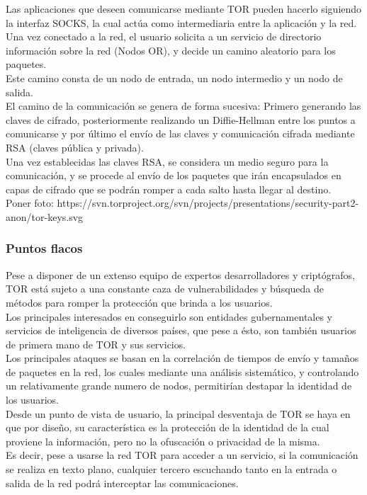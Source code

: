 Las aplicaciones que deseen comunicarse mediante TOR pueden hacerlo siguiendo la interfaz SOCKS, la cual actúa como intermediaria entre la aplicación y la red. \\

Una vez conectado a la red, el usuario solicita a un servicio de directorio información sobre la red (Nodos OR), y decide un camino aleatorio para los paquetes. \\ Este camino consta de un nodo de entrada, un nodo intermedio y un nodo de salida. \\

El camino de la comunicación se genera de forma sucesiva: Primero generando las claves de cifrado, posteriormente realizando un Diffie-Hellman entre los puntos a comunicarse	y por último el envío de las claves y comunicación cifrada mediante RSA (claves pública y privada). \\

Una vez establecidas las claves RSA, se considera un medio seguro para la comunicación, y se procede al envío de los paquetes que irán encapsulados en capas de cifrado que se podrán romper a cada salto hasta llegar al destino. \\ 

Poner foto: https://svn.torproject.org/svn/projects/presentations/security-part2-anon/tor-keys.svg

\subsubsection {Puntos flacos}

Pese a disponer de un extenso equipo de expertos desarrolladores y criptógrafos, TOR está sujeto a una constante caza de vulnerabilidades y búsqueda de métodos para romper la protección que brinda a los usuarios. \\
Los principales interesados en conseguirlo son entidades gubernamentales y servicios de inteligencia de diversos países, que pese a ésto, son también usuarios de primera mano de TOR y sus servicios. \\ 

Los principales ataques se basan en la correlación de tiempos de envío y tamaños de paquetes en la red, los cuales mediante una análisis sistemático, y controlando un relativamente grande numero de nodos, permitirían destapar la identidad de los usuarios. \\


Desde un punto de vista de usuario, la principal desventaja de TOR se haya en que por diseño, su característica es la protección de la identidad de la cual proviene la información, pero no la ofuscación o privacidad de la misma. \\ 
Es decir, pese a usarse la red TOR para acceder a un servicio, si la comunicación se realiza en texto plano, cualquier tercero escuchando tanto en la entrada o salida de la red podrá interceptar las comunicaciones. \\ 

